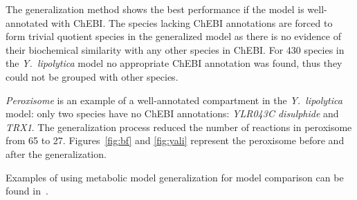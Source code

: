 \documentclass[9pt]{article}
\newcounter{fig}
\newcounter{rm}
\begin{document}
The generalization method shows the best performance if the model is well-annotated with ChEBI. The species lacking ChEBI annotations are forced to form trivial quotient species in the generalized model as there is no evidence of their biochemical similarity with any other species in ChEBI.  For 430 species in the \textit{Y.~lipolytica} model no appropriate ChEBI annotation was found, thus they could not be grouped with other species. 

\emph{Peroxisome} is an example of a well-annotated compartment in the \textit{Y.~lipolytica} model: only two species have no ChEBI annotations: \emph{YLR043C disulphide} and \emph{TRX1}. The generalization process reduced the number of reactions in peroxisome from 65 to 27. Figures~\ref{fig:bf} and \ref{fig:yali} represent the peroxisome before and after the generalization.

Examples of using metabolic model generalization for model comparison can be found in~\citep{Zhukova}.


\end{document}
